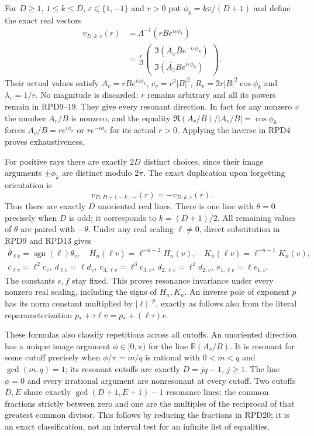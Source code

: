 \documentclass[11pt]{article}
\begin{document}
For $D\ge1$, $1\le k\le D$, $\varepsilon\in\{1,-1\}$ and $r>0$
put $\phi_k=k\pi/(D+1)$ and define the exact real vectors
\[
 \begin{aligned}
 v_{D,k,\varepsilon}(r)
 &=\Lambda^{-1}(rB e^{i\varepsilon\phi_k})\\
 &=\frac r\Delta
 \begin{pmatrix}
 \Im(A_x\bar B e^{-i\varepsilon\phi_k})\\
 \Im(\overline{A_z}B e^{i\varepsilon\phi_k})
 \end{pmatrix}.
 \end{aligned}\tag{RPD20}
\]
Their actual values satisfy $A_v=rB e^{i\varepsilon\phi_k}$,
$c_v=r^2|B|^2$, $R_v=2r|B|^2\cos\phi_k$ and
$\lambda_v=1/r$.  No magnitude is discarded: $r$ remains arbitrary
and all its powers remain in RPD9--19.
They give every resonant direction.  In fact for any nonzero $v$
the number $A_v/B$ is nonzero, and the equality
$\Re(A_v/B)/|A_v/B|=\cos\phi_k$ forces
$A_v/B=r e^{i\phi_k}$ or $r e^{-i\phi_k}$ for its actual $r>0$.
Applying the inverse in RPD4 proves exhaustiveness.

For positive rays there are exactly $2D$ distinct choices, since
their image arguments $\pm\phi_k$ are distinct modulo $2\pi$.
The exact duplication upon forgetting orientation is
\[
 v_{D,D+1-k,-\varepsilon}(r)=-v_{D,k,\varepsilon}(r).
 \tag{RPD21}
\]
Thus there are exactly $D$ unoriented real lines.  There is one
line with $\theta=0$ precisely when $D$ is odd; it corresponds to
$k=(D+1)/2$.  All remaining values of $\theta$ are paired with
$-\theta$.  Under any real scaling $\ell\ne0$, direct substitution
in RPD9 and RPD13 gives
\[
 \begin{gathered}
 \theta_{\ell v}=\operatorname{sgn}(\ell)\theta_v,\quad
 H_n(\ell v)=\ell^{-n-2}H_n(v),\quad
 K_n(\ell v)=\ell^{-n-1}K_n(v),\\
 c_{\ell v}=\ell^2c_v,\ d_{\ell v}=\ell d_v,\
 c_{3,\ell v}=\ell^3c_{3,v},\ d_{2,\ell v}=\ell^2d_{2,v},\
 e_{1,\ell v}=\ell e_{1,v}.
 \end{gathered}
 \tag{RPD22}
\]
The constants $e,f$ stay fixed.  This proves resonance invariance
under every nonzero real scaling, including the signs of $H_n,K_n$.
An inverse pole of exponent $p$ has its norm constant multiplied by
$|\ell|^{-p}$, exactly as follows also from the literal reparameterization
$p_*+\tau\ell v=p_*+(\ell\tau)v$.

These formulas also classify repetitions across all cutoffs.  An
unoriented direction has a unique image argument
$\phi\in[0,\pi)$ for the line $\mathbb R(A_v/B)$.
It is resonant for some cutoff precisely when
$\phi/\pi=m/q$ is rational with $0<m<q$ and $\gcd(m,q)=1$;
its resonant cutoffs are exactly $D=jq-1$, $j\ge1$.
The line $\phi=0$ and every irrational argument are nonresonant at
every cutoff.  Two cutoffs $D,E$ share exactly
$\gcd(D+1,E+1)-1$ resonance lines: the common fractions strictly
between zero and one are the multiples of the reciprocal of that
greatest common divisor.  This follows by reducing the fractions
in RPD20; it is an exact classification, not an interval test for
an infinite list of equalities.
\end{document}
